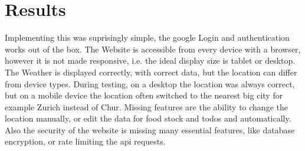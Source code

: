\section{Results}\label{sec:Results}

Implementing this was suprisingly simple, the google Login and authentication works out of the box.
The Website is accessible from every device with a browser, however it is not made responsive, i.e. the ideal display size is tablet or desktop.
The Weather is displayed correctly, with correct data, but the location can differ from device types.
During testing, on a desktop the location was always correct, but on a mobile device the location often switched to the nearest big city for example Zurich instead of Chur.
Missing features are the ability to change the location manually, or edit the data for food stock and todos and automatically.
Also the security of the website is missing many essential features, like database encryption, or rate limiting the api requests.
